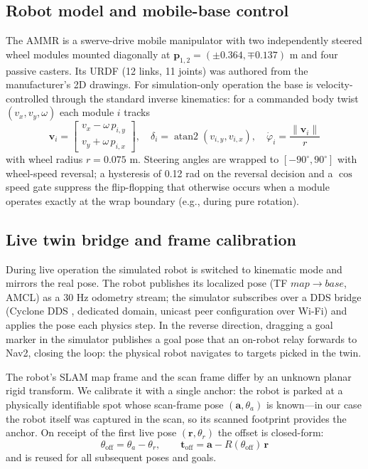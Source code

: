 \documentclass[conference]{IEEEtran}
\begin{document}
\subsection{Robot model and mobile-base control}
The AMMR is a swerve-drive mobile manipulator with two independently
steered wheel modules mounted diagonally at $\mathbf{p}_{1,2}=
(\pm0.364, \mp0.137)$ m and four passive casters. Its URDF (12 links,
11 joints) was authored from the manufacturer's 2D drawings. For
simulation-only operation the base is velocity-controlled through the
standard inverse kinematics: for a commanded body twist
$(v_x, v_y, \omega)$ each module $i$ tracks
\begin{equation}
\mathbf{v}_i = \begin{bmatrix} v_x - \omega\, p_{i,y} \\
v_y + \omega\, p_{i,x} \end{bmatrix},\quad
\delta_i = \operatorname{atan2}(v_{i,y}, v_{i,x}),\quad
\dot\varphi_i = \frac{\lVert \mathbf{v}_i \rVert}{r}
\label{eq:swerve}
\end{equation}
with wheel radius $r=0.075$ m. Steering angles are wrapped to
$[-90^\circ, 90^\circ]$ with wheel-speed reversal; a hysteresis of
0.12 rad on the reversal decision and a $\cos$ speed gate suppress the
flip-flopping that otherwise occurs when a module operates exactly at
the wrap boundary (e.g., during pure rotation).

\subsection{Live twin bridge and frame calibration}
During live operation the simulated robot is switched to kinematic
mode and mirrors the real pose. The robot publishes its localized pose
(TF $map\rightarrow base$, AMCL) as a 30 Hz odometry stream; the
simulator subscribes over a DDS bridge (Cyclone DDS \cite{cyclonedds},
dedicated domain, unicast peer configuration over Wi-Fi) and applies
the pose each physics step. In the reverse direction, dragging a goal
marker in the simulator publishes a goal pose that an on-robot relay
forwards to Nav2, closing the loop: the physical robot navigates to
targets picked in the twin.

The robot's SLAM map frame and the scan frame differ by an unknown
planar rigid transform. We calibrate it with a single anchor: the
robot is parked at a physically identifiable spot whose scan-frame
pose $(\mathbf{a}, \theta_a)$ is known---in our case the robot itself
was captured in the scan, so its scanned footprint provides the
anchor. On receipt of the first live pose $(\mathbf{r}, \theta_r)$ the
offset is closed-form:
\begin{equation}
\theta_{\mathrm{off}} = \theta_a - \theta_r, \qquad
\mathbf{t}_{\mathrm{off}} = \mathbf{a} - R(\theta_{\mathrm{off}})\,\mathbf{r}
\label{eq:anchor}
\end{equation}
and is reused for all subsequent poses and goals.
\end{document}
